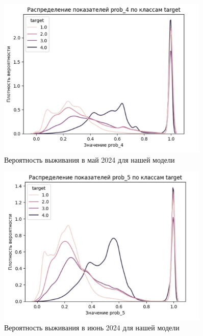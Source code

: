 \documentclass[a4paper,14pt,oneside,openany]{memoir}
\begin{document}
\begin{figure}[H]
	\includegraphics[width=0.9\textwidth]{../figures/prob_4_ours.png}
	\caption{Вероятность выживания в май 2024 для нашей модели}
\end{figure}

\begin{figure}[H]
	\includegraphics[width=0.9\textwidth]{../figures/prob_5_ours.png}
	\caption{Вероятность выживания в июнь 2024 для нашей модели}
\end{figure}
\end{document}
